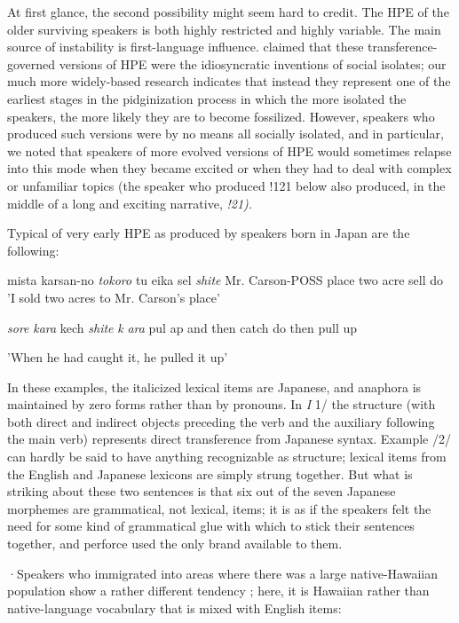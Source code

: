 At first glance, the second possibility might seem hard to credit. The HPE of the older surviving speakers is both highly restricted and highly variable. The main source of instability is first-language influ\-ence. \citet{Labov1971} claimed that these transference-governed versions of HPE were the idiosyncratic inventions of social isolates; our much more widely-based research indicates that instead they represent one of the earliest stages in the pidginization process in which the more isolated the speakers, the more likely they are to become fossilized. However, speakers who produced such versions were by no means all socially isolated, and in particular, we noted that speakers of more evolved versions of HPE would sometimes relapse into this mode when they became excited or when they had to deal with complex or un\-familiar topics (the speaker who produced !121 below also produced, in the middle of a long and exciting narrative, \textit{!21).}

Typical of very early HPE as produced by speakers born in Japan are the following:

\ea\label{ex:1}
mista karsan-no \textit{to}\textit{k}\textit{oro} tu eika sel \textit{shite} Mr. Carson-POSS place two acre sell do 'I sold two acres to Mr. Carson's place'
\glt
\z

\ea\label{ex:2}
\textit{sore} \textit{kara} kech \textit{shite} \textit{k} \textit{ara} pul ap and then catch do then pull up
\glt
\z

'When he had caught it, he pulled it up'


In these examples, the italicized lexical items are Japanese, and ana\-phora is maintained by zero forms rather than by pronouns. In \textit{I} 1/ the structure (with both direct and indirect objects preceding the verb and the auxiliary following the main verb) represents direct transference from Japanese syntax. Example /2/ can hardly be said to have anything recognizable as structure; lexical items from the English and Japanese lexicons are simply strung together. But what is striking about these two sentences is that six out of the seven Japanese morphemes are grammatical, not lexical, items; it is as if the speakers felt the need for some kind of grammatical glue with which to stick their sentences together, and perforce used the only brand available to them.

·Speakers who immigrated into areas where there was a large native-Hawaiian population show a rather different tendency ; here, it is Hawaiian rather than native-language vocabulary that is mixed with English items:

